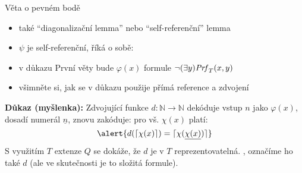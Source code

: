 \documentclass{beamer}
\begin{document}
\begin{frame}{Věta o pevném bodě}
    

    \begin{itemize}
        \item také ``diagonalizační lemma'' nebo ``self-referenční'' lemma
        \item $\psi$ je \alert{self-referenční}, říká o sobě: 
        \item v důkazu První věty bude $\varphi(x)$ formule $\neg(\exists y)\mathit{Prf}_T(x,y)$
        \item všimněte si, jak se v důkazu použije přímá reference a zdvojení
    \end{itemize}

    \textbf{Důkaz (myšlenka):} \alert{Zdvojující funkce} $d\colon\mathbb N\to\mathbb N$ dekóduje vstup $n$ jako $\varphi(x)$, dosadí numerál $\underline{n}$, znovu zakóduje: pro vš. $\chi(x)$ platí:
    $$
    \alert{d(\lceil \chi(x)\rceil)=\lceil\chi(\underline{\chi(x)})\rceil}
    $$
    S využitím $T$ extenze $Q$ se dokáže, že $d$ je v $T$ \alert{reprezentovatelná}. , označíme ho také $d$ (ale ve skutečnosti je to složitá formule).
    
\end{frame}
\end{document}
